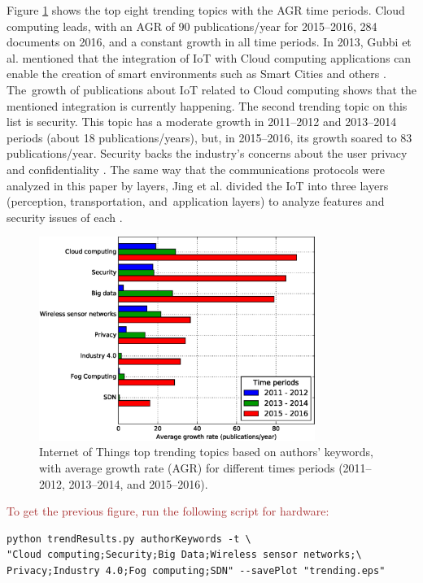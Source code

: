 \documentclass[symmetry,article,accept,moreauthors,pdftex10pt,a4paper]{mdpi}
\begin{document}
Figure \ref{fig_trending} shows the top eight trending topics with the AGR time periods. Cloud computing leads, with an AGR of 90 publications/year for 2015--2016, 284 documents on 2016, and a constant growth in all time periods. In 2013, Gubbi et al. mentioned that the integration of IoT with Cloud computing applications can enable the creation of smart environments such as Smart Cities and others \cite{Gubbi20131645}. The~growth of publications about IoT related to Cloud computing shows that the mentioned integration is currently happening. The second trending topic on this list is security. This topic has a moderate growth in 2011--2012 and 2013--2014 periods (about 18 publications/years), but, in 2015--2016, its growth soared to 83 publications/year. Security backs the industry's concerns about the user privacy and confidentiality \cite{Zhang2018,Suo2012648}. The same way that the communications protocols were analyzed in this paper by layers, Jing et al. divided the IoT into three layers (perception, transportation, and~application layers) to analyze features and security issues of each \cite{Jing2014}.

\begin{figure}[H]
	\centering
	\includegraphics[width=0.8\textwidth]{./graphs/figure9.eps}
	\caption{Internet of Things top trending topics based on authors' keywords, with average growth rate (AGR) for different times periods (2011--2012, 2013--2014, and 2015--2016).}
	\label{fig_trending}
\end{figure} 

\noindent
\textcolor{brown}{To get the previous figure, run the following script for hardware:}\\
\begin{verbatim}
python trendResults.py authorKeywords -t \
"Cloud computing;Security;Big Data;Wireless sensor networks;\
Privacy;Industry 4.0;Fog computing;SDN" --savePlot "trending.eps"
\end{verbatim}
\end{document}
